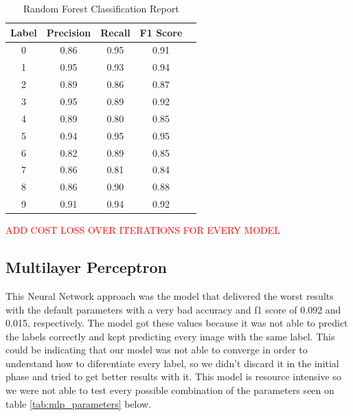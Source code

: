 \documentclass[conference]{IEEEtran}
\begin{document}
\begin{table}[!h]
    \centering
    \begin{tabular}{|c|c|c|c|r|}
        \hline
        \textbf{Label} & \textbf{Precision} & \textbf{Recall} & \textbf{F1 Score} \\ \hline
        0              & 0.86               & 0.95            & 0.91              \\ \hline
        1              & 0.95               & 0.93            & 0.94              \\ \hline
        2              & 0.89               & 0.86            & 0.87              \\ \hline
        3              & 0.95               & 0.89            & 0.92              \\ \hline
        4              & 0.89               & 0.80            & 0.85              \\ \hline
        5              & 0.94               & 0.95            & 0.95              \\ \hline
        6              & 0.82               & 0.89            & 0.85              \\ \hline
        7              & 0.86               & 0.81            & 0.84              \\ \hline
        8              & 0.86               & 0.90            & 0.88              \\ \hline
        9              & 0.91               & 0.94            & 0.92              \\ \hline
    \end{tabular}
    \caption{Random Forest Classification Report \label{tab:rfc_classification_report}}
\end{table}

\textcolor{red}{ADD COST LOSS OVER ITERATIONS FOR EVERY MODEL}

\subsection{Multilayer Perceptron}
This Neural Network approach was the model that delivered the worst results with the default parameters with a very bad accuracy and f1 score of 0.092 and 0.015, respectively.
The model got these values because it was not able to predict the labels correctly and kept predicting every image with the same label. This could be indicating that our model was not able to converge in order to understand how to diferentiate every label,
so we didn't discard it in the initial phase and tried to get better results with it.
This model is resource intensive so we were not able to test every possible combination of the parameters seen on table \ref{tab:mlp_parameters} below.
\end{document}
